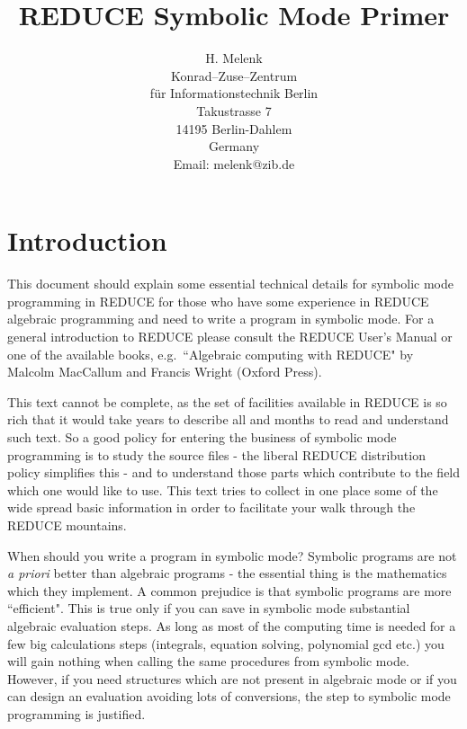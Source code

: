 \documentclass[11pt]{article}
\title{REDUCE Symbolic Mode Primer}
\date{}
\author{
H. Melenk \\[0.05in]
Konrad--Zuse--Zentrum \\
f\"ur Informationstechnik Berlin \\
Takustrasse 7 \\
14195 Berlin-Dahlem \\
Germany \\[0.05in]
Email:  melenk@zib.de \\[0.05in]}
\newcommand{\reduce}{\small REDUCE}
\begin{document}
\maketitle
\section{Introduction}

This document should explain some essential technical details for
symbolic mode programming in {\reduce} for those who
have some experience in {\reduce} algebraic programming
and need to write a program in symbolic mode. For a general
introduction to {\reduce} please consult the {\reduce} User's
Manual or one of the available books, e.g.\  ``Algebraic
computing with REDUCE" by Malcolm MacCallum and Francis
Wright (Oxford Press).

This text cannot be complete, as the set of facilities
available in {\reduce} is so rich that it would take years
to describe all and months to read and understand such text.
So a good policy for entering the business of symbolic mode
programming is to study the source files - the
liberal {\reduce} distribution policy simplifies this -
and to understand those parts which contribute to the
field which one would like to use. This text tries to
collect in one place some of the wide spread basic information
in order to facilitate your walk through the {\reduce} mountains.

When should you write a program in symbolic mode?
Symbolic programs are not {\it a priori} better than algebraic
programs - the essential thing is the mathematics which they
implement. A common prejudice is that symbolic programs
are more ``efficient". This is true only if you can
save in symbolic mode substantial algebraic evaluation
steps. As long as most of the
computing time is needed for a few big calculations steps
(integrals, equation solving, polynomial gcd etc.)
you will gain nothing when calling the same procedures
from symbolic mode. However, if you need structures
which are not present in algebraic mode or if you
can design an evaluation avoiding lots of conversions,
the step to symbolic mode programming is justified.
\end{document}
